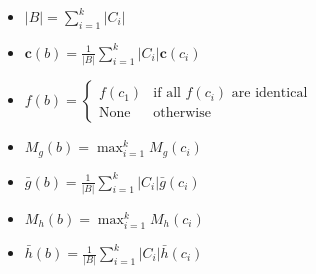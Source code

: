 \begin{itemize}

\item $\displaystyle |B| = \sum_{i=1}^k |C_i|$

\item $\displaystyle \mathbf{c}(b) = \frac{1}{|B|} \sum_{i=1}^k |C_i| \mathbf{c}(c_i)$

\item $f(b) = \left\{
\begin{array}{ll}
f(c_1) & \mbox{if all }f(c_i)\mbox{ are identical} \\
\mbox{None} & \mbox{otherwise}
\end{array}
\right.$

\item $\displaystyle M_g(b) = \max_{i=1}^k M_g(c_i)$

\item $\displaystyle \bar{g}(b) = \frac{1}{|B|} \sum_{i=1}^k |C_i| \bar{g}(c_i)$

\item $\displaystyle M_h(b) = \max_{i=1}^k M_h(c_i)$

\item $\displaystyle \bar{h}(b) = \frac{1}{|B|} \sum_{i=1}^k |C_i| \bar{h}(c_i)$

\end{itemize}

